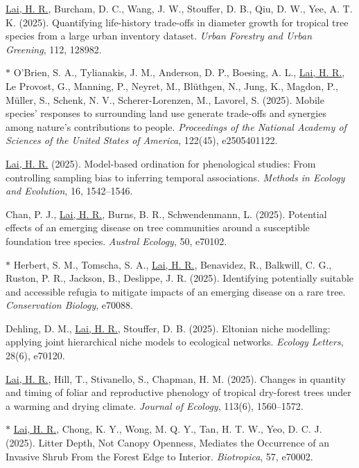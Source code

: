 \documentclass[a4paper]{article}
\begin{document}
\hangindent=1cm \underline{Lai, H. R.}, Burcham, D. C., Wang, J. W., Stouffer, D. B., Qiu, D. W., Yee, A. T. K. (2025). Quantifying life-history trade-offs in diameter growth for tropical tree species from a large urban inventory dataset. \textit{Urban Forestry and Urban Greening}, 112, 128982.

$\ast$ \hangindent=1cm O'Brien, S. A., Tylianakis, J. M., Anderson, D. P., Boesing, A. L., \underline{Lai, H. R.}, Le Provost, G., Manning, P., Neyret, M., Blüthgen, N., Jung, K., Magdon, P., Müller, S., Schenk, N. V., Scherer-Lorenzen, M., Lavorel, S. (2025). Mobile species' responses to surrounding land use generate trade-offs and synergies among nature's contributions to people. \textit{Proceedings of the National Academy of Sciences of the United States of America}, 122(45), e2505401122.

\hangindent=1cm \underline{Lai, H. R.} (2025). Model-based ordination for phenological studies: From controlling sampling bias to inferring temporal associations. \textit{Methods in Ecology and Evolution}, 16, 1542--1546.

\hangindent=1cm Chan, P. J., \underline{Lai, H. R.}, Burns, B. R., Schwendenmann, L. (2025). Potential effects of an emerging disease on tree communities around a susceptible foundation tree species. \textit{Austral Ecology}, 50, e70102.

$\ast$ \hangindent=1cm Herbert, S. M., Tomscha, S. A., \underline{Lai, H. R.}, Benavidez, R., Balkwill, C. G., Ruston, P. R., Jackson, B., Deslippe, J. R. (2025). Identifying potentially suitable and accessible refugia to mitigate impacts of an emerging disease on a rare tree. \textit{Conservation Biology}, e70088.

\hangindent=1cm Dehling, D. M., \underline{Lai, H. R.}, Stouffer, D. B. (2025). Eltonian niche modelling: applying joint hierarchical niche models to ecological networks. \textit{Ecology Letters}, 28(6), e70120.

\hangindent=1cm \underline{Lai, H. R.}, Hill, T., Stivanello, S., Chapman, H. M. (2025). Changes in quantity and timing of foliar and reproductive phenology of tropical dry-forest trees under a warming and drying climate. \textit{Journal of Ecology}, 113(6), 1560--1572.

$\ast$ \hangindent=1cm \underline{Lai, H. R.}, Chong, K. Y., Wong, M. Q. Y., Tan, H. T. W., Yeo, D. C. J. (2025). Litter Depth, Not Canopy Openness, Mediates the Occurrence of an Invasive Shrub From the Forest Edge to Interior. \textit{Biotropica}, 57, e70002.
\end{document}
